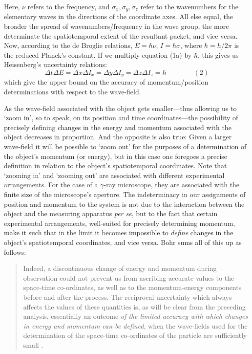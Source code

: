 \documentclass[12pt,english,twoside]{article}
\numberwithin{equation}{section}
\begin{document}
Here, $\nu$ refers to the frequency, and $\sigma_x, \sigma_y, \sigma_z$ refer to the wavenumbers for the elementary waves in the directions of the coordinate axes. All else equal, the broader the spread of wavenumbers/frequency in the wave group, the more determinate the spatiotemporal extent of the resultant packet, and vice versa. Now, according to the de Broglie relations, $E = \hbar\nu$, $I = \hbar\sigma$, where $\hbar = h / 2\pi$ is the reduced Planck's constant. If we multiply equation (1a) by $\hbar$, this gives us Heisenberg's uncertainty relations: $$\Delta t \Delta E = \Delta x \Delta I_x = \Delta y \Delta I_y = \Delta z \Delta I_z = \hbar\qquad\qquad(2)$$ which give the upper bound on the accuracy of momentum/position determinations with respect to the wave-field.

As the wave-field associated with the object gets smaller---thus allowing us to `zoom in', so to speak, on its position and time coordinates---the possibility of precisely defining changes in the energy and momentum associated with the object decreases in proportion. And the opposite is also true: Given a larger wave-field it will be possible to `zoom out' for the purposes of a determination of the object's momentum (or energy), but in this case one foregoes a precise definition in relation to the object's spatiotemporal coordinates. Note that `zooming in' and `zooming out' are associated with different experimental arrangements. For the case of a $\gamma$-ray microscope, they are associated with the finite size of the microscope's aperture. The indeterminacy in our assignments of position and momentum to the system is not due to the interaction between the object and the measuring apparatus \emph{per se}, but to the fact that certain experimental arrangements, well-suited for precisely determining momentum, make it such that in the limit it becomes impossible to \emph{define} changes in the object's spatiotemporal coordinates, and vice versa. Bohr sums all of this up as follows:

\begin{quote}
Indeed, a discontinuous change of energy and momentum during observation could not prevent us from ascribing accurate values to the space-time co-ordinates, as well as to the momentum-energy components before and after the process. The reciprocal uncertainty which always affects the values of these quantities is, as will be clear from the preceding analysis, essentially an outcome \emph{of the limited accuracy with which changes in energy and momentum can be defined}, when the wave-fields used for the determination of the space-time co-ordinates of the particle are sufficiently small \citep[p. 583. emphasis mine]{bohr1928}.
\end{quote}
\end{document}
